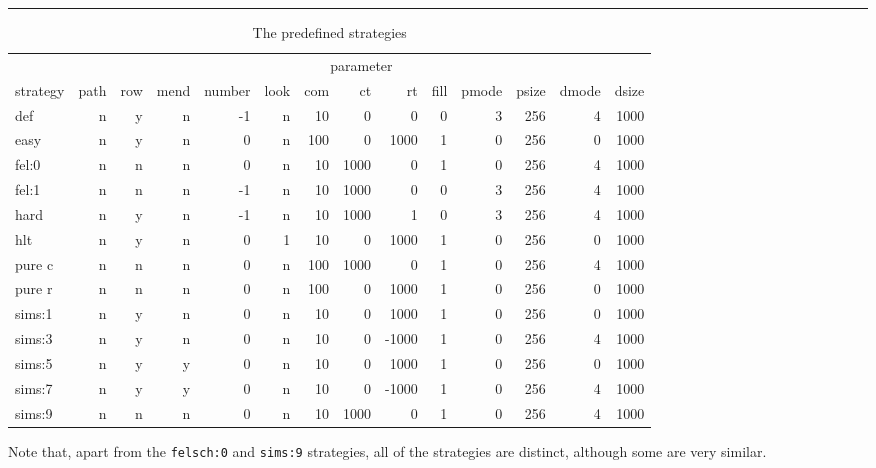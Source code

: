 \begin{table}
\hrule
\caption{The predefined strategies}
\label{tab:pred}
\smallskip
\renewcommand{\arraystretch}{0.875}
\begin{tabular*}{\textwidth}{@{\extracolsep{\fill}}lrrrrrrrrrrrrr} 
\hline\hline
          & \multicolumn{13}{c}{parameter} \\ 
\cline{2-14}
strategy & path & row & mend & number & look & com & ct   & rt    & fill &
pmode & psize & dmode & dsize \\ 
\hline
def    & n   & y   & n    & -1 & n    & 10  & 0    & 0     & 0  & 3    & 256  & 4    & 1000 \\
easy   & n   & y   & n    & 0  & n    & 100 & 0    & 1000  & 1  & 0    & 256  & 0    & 1000 \\
fel:0  & n   & n   & n    & 0  & n    & 10  & 1000 & 0     & 1  & 0    & 256  & 4    & 1000 \\
fel:1  & n   & n   & n    & -1 & n    & 10  & 1000 & 0     & 0  & 3    & 256  & 4    & 1000 \\
hard   & n   & y   & n    & -1 & n    & 10  & 1000 & 1     & 0  & 3    & 256  & 4    & 1000 \\
hlt    & n   & y   & n    & 0  & 1    & 10  & 0    & 1000  & 1  & 0    & 256  & 0    & 1000 \\
pure c & n   & n   & n    & 0  & n    & 100 & 1000 & 0     & 1  & 0    & 256  & 4    & 1000 \\
pure r & n   & n   & n    & 0  & n    & 100 & 0    & 1000  & 1  & 0    & 256  & 0    & 1000 \\
sims:1 & n   & y   & n    & 0  & n    & 10  & 0    & 1000  & 1  & 0    & 256  & 0    & 1000 \\
sims:3 & n   & y   & n    & 0  & n    & 10  & 0    & -1000 & 1  & 0    & 256  & 4    & 1000 \\
sims:5 & n   & y   & y    & 0  & n    & 10  & 0    & 1000  & 1  & 0    & 256  & 0    & 1000 \\
sims:7 & n   & y   & y    & 0  & n    & 10  & 0    & -1000 & 1  & 0    & 256  & 4    & 1000 \\
sims:9 & n   & n   & n    & 0  & n    & 10  & 1000 & 0     & 1  & 0    & 256  & 4    & 1000 \\
\hline\hline
\end{tabular*}
\end{table}

Note that, apart from the {\tt felsch:0} and {\tt sims:9} strategies, all of the
strategies are distinct, although some are very similar.

